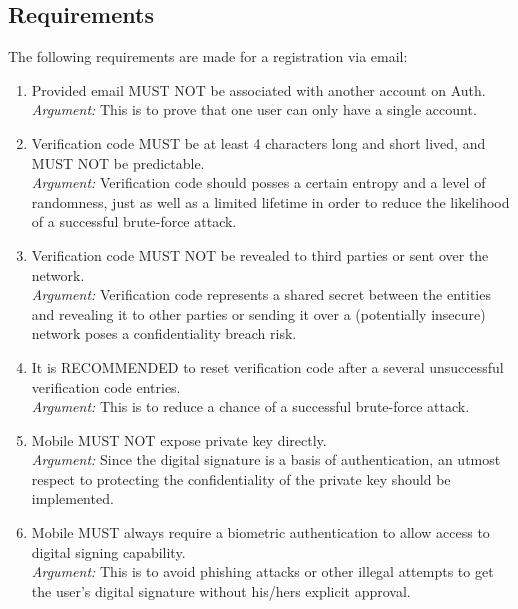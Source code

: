     \subsection{Requirements}
    The following requirements are made for a registration via email:
    \begin{enumerate}
        \item Provided email MUST NOT be associated with another account on Auth.\\
        \textit{Argument:} This is to prove that one user can only have a single account.

        \item Verification code MUST be at least 4 characters long and short lived, and MUST NOT be 
              predictable.\\        
        \textit{Argument:} Verification code should posses a certain entropy and a level of randomness, 
                           just as well as a limited lifetime in order to reduce the likelihood of a 
                           successful brute-force attack.

        \item Verification code MUST NOT be revealed to third parties or sent over the network.\\        
        \textit{Argument:} Verification code represents a shared secret between the entities and revealing 
                           it to other parties or sending it over a (potentially insecure) network poses 
                           a confidentiality breach risk. 

        \item It is RECOMMENDED to reset verification code after a several unsuccessful verification 
              code entries.\\        
        \textit{Argument:} This is to reduce a chance of a successful brute-force attack.

        \item Mobile MUST NOT expose private key directly.\\
        \textit{Argument:} Since the digital signature is a basis of authentication, an utmost respect to 
                           protecting the confidentiality of the private key should be implemented.

        \item Mobile MUST always require a biometric authentication to allow access to digital signing 
              capability.\\        
        \textit{Argument:} This is to avoid phishing attacks or other illegal attempts to get the user's 
                           digital signature without his/hers explicit approval.


\end{enumerate}
